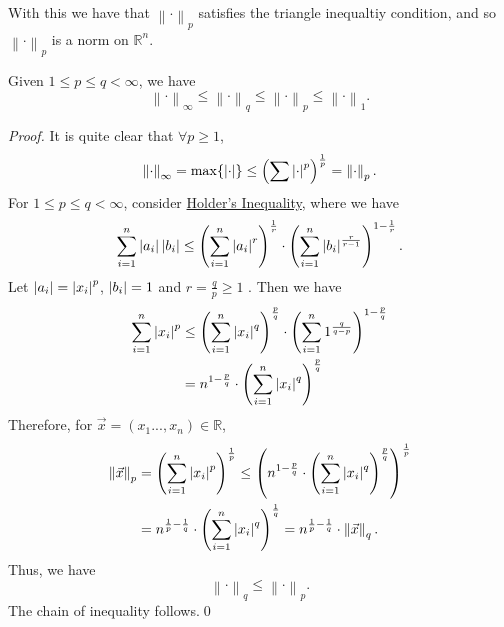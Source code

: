 \documentclass[notoc,notitlepage]{tufte-book}
\newcommand{\norm}[1]{\left\| #1 \right\|}
\begin{document}
\begin{note}
  With this we have that $\norm\cdot_p$ satisfies the triangle inequaltiy condition, and so $\norm\cdot_p$ is a norm on $\mathbb{R}^n$.
\end{note}

\begin{note}
  Given $1 \leq p \leq q < \infty$, we have
  \begin{equation*}
    \norm\cdot_\infty \leq \norm\cdot_q \leq \norm\cdot_p \leq \norm\cdot_1.
  \end{equation*}

  \begin{proof}
    It is quite clear that $\forall p \geq 1$,
    \begin{equation*}
      \norm\cdot_\infty = \max \{ \abs{\cdot} \} \leq \left( \sum \abs{\cdot}^p \right)^{\frac{1}{p}} =\norm\cdot_p.
    \end{equation*}
    For $1 \leq p \leq q < \infty$, consider \hyperref[thm:holder_s_inequality]{Holder's Inequality}, where we have
    \begin{equation*}
      \sum_{i=1}^{n} \left|a_i\right| \left|b_i\right| \leq \left( \sum_{i=1}^{n} \left|a_i\right|^r \right)^{\frac{1}{r}} \cdot \left( \sum_{i=1}^{n} \left|b_i\right|^{\frac{r}{r - 1}} \right)^{1 - \frac{1}{r}}.
    \end{equation*}
    Let $\left|a_i\right| = \left|x_i\right|^p$, $\left|b_i\right| = 1$ and $r = \frac{q}{p} \geq 1$ . Then we have
    \begin{align*}
      \sum_{i=1}^{n} \left|x_i\right|^p &\leq \left( \sum_{i=1}^{n} \left|x_i\right|^q \right)^{\frac{p}{q}} \cdot \left( \sum_{i=1}^{n} 1^{\frac{q}{q - p}} \right)^{1 - \frac{p}{q}} \\
                                 &= n^{1 - \frac{p}{q}} \cdot \left( \sum_{i=1}^{n} \left|x_i\right|^q \right)^\frac{p}{q}
    \end{align*}
    Therefore, for $\vec{x} = (x_1..., x_n) \in \mathbb{R}$,
    \begin{align*}
      \norm{\vec{x}}_p &= \left( \sum_{i=1}^{n} \abs{x_i}^p \right)^{\frac{1}{p}} \leq \left( n^{1 - \frac{p}{q}} \cdot \left( \sum_{i=1}^{n} \abs{x_i}^q \right)^\frac{p}{q} \right)^{\frac{1}{p}} \\
                       &= n^{\frac{1}{p} - \frac{1}{q}} \cdot \left( \sum_{i=1}^{n} \abs{x_i}^q \right)^{\frac{1}{q}} = n^{\frac{1}{p} - \frac{1}{q}} \cdot \norm{\vec{x}}_q.
    \end{align*}
    Thus, we have
    \begin{equation*}
      \norm\cdot_q \leq \norm\cdot_p.
    \end{equation*}
    The chain of inequality follows.\qed
  \end{proof}
\end{note}
\end{document}
